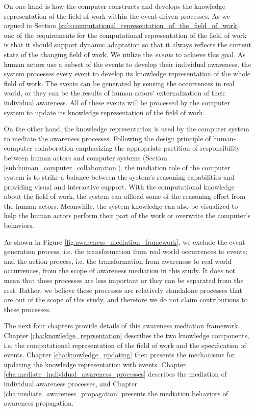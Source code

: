 On one hand is how the computer constructs and develops the knowledge representation of the field of work within the event-driven processes. As we argued in Section \ref{sub:computational_representation_of_the_field_of_work}, one of the requirements for the computational representation of the field of work is that it should support dynamic adaptation so that it always reflects the current state of the changing field of work. We utilize the \emph{events} to achieve this goal. As human actors use a subset of the events to develop their individual awareness, the system processes every event to develop its knowledge representation of the whole field of work. The events can be generated by sensing the occurrences in real world, or they can be the results of human actors' externalization of their individual awareness. All of these events will be processed by the computer system to update its knowledge representation of the field of work.

On the other hand, the knowledge representation is used by the computer system to mediate the awareness processes. Following the design principle of human-computer collaboration emphasizing the appropriate partition of responsibility between human actors and computer systems (Section \ref{sub:human_computer_collaboration}), the mediation role of the computer system is to strike a balance between the system's reasoning capabilities and providing visual and interactive support. With the computational knowledge about the field of work, the system can offload some of the reasoning effort from the human actors. Meanwhile, the system knowledge can also be visualized to help the human actors perform their part of the work or overwrite the computer's behaviors. 

As shown in Figure \ref{fig:awareness_mediation_framework}, we exclude the event generation process, i.e. the transformation from real world occurrences to events; and the action process, i.e. the transformation from awareness to real world occurrences, from the scope of awareness mediation in this study. It does not mean that these processes are less important or they can be separated from the rest. Rather, we believe these processes are relatively standalone processes that are out of the scope of this study, and therefore we do not claim contributions to these processes. 

The next four chapters provide details of this awareness mediation framework. Chapter \ref{cha:knowledge_reprsentation} describes the two knowledge components, i.e. the computational representation of the field of work and the specification of events. Chapter \ref{cha:knowledge_updating} then presents the mechanisms for updating the knowledge representation with events. Chapter \ref{cha:mediate_individual_awareness_processes} describes the mediation of individual awareness processes, and Chapter \ref{cha:mediate_awareness_propagation} presents the mediation behaviors of awareness propagation.





 

